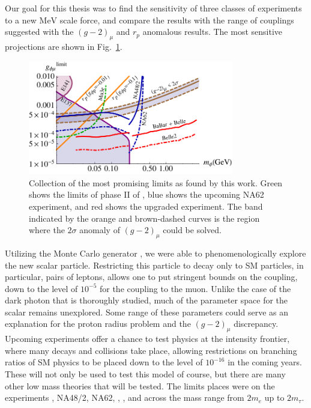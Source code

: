 \label{chapter:conclusion}

Our goal for this thesis was to find the sensitivity of three classes of experiments to a new $\textrm{MeV}$ scale force, and compare the results with the range of couplings suggested with the $(g-2)_\mu$ and $r_p$ anomalous results.
The most sensitive projections are shown in Fig.~\ref{fig:best_limits}.

\begin{figure}[h]
    \centering
    \includegraphics[width=0.8\textwidth]{Figures/limits/best_limits}
    \caption{Collection of the most promising limits as found by this work. Green shows the limits of phase II of \mueee, blue shows the upcoming NA62 experiment, and red shows the upgraded \belletwo experiment. The band indicated by the orange and brown-dashed curves is the region where the $2\sigma$ anomaly of $(g-2)_\mu$ could be solved.} 
    \label{fig:best_limits}
\end{figure}

Utilizing the Monte Carlo generator \madgraph, we were able to phenomenologically explore the new scalar particle.
Restricting this particle to decay only to SM particles, in particular, pairs of leptons, allows one to put stringent bounds on the coupling, down to the level of $10^{-5}$ for the coupling to the muon.
Unlike the case of the dark photon that is thoroughly studied, much of the parameter space for the scalar remains unexplored.
Some range of these parameters could serve as an explanation for the proton radius problem and the $(g-2)_\mu$ discrepancy.
Upcoming experiments offer a chance to test physics at the intensity frontier, where many decays and collisions take place, allowing restrictions on branching ratios of SM physics to be placed down to the level of $10^{-16}$ in the coming years.
These will not only be used to test this model of course, but there are many other low mass theories that will be tested.
The limits places were on the experiments \mueee, NA48/2, NA62, \babar, \belle, and \belletwo across the mass range from $2m_e$ up to $2m_\tau$.

